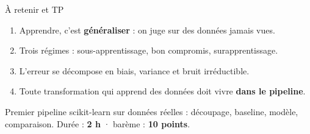 \begin{frame}{À retenir et TP}
\begin{kbox}
\begin{enumerate}
  \item Apprendre, c'est \textbf{généraliser} : on juge sur des données jamais vues.
  \item Trois régimes : sous-apprentissage, bon compromis, surapprentissage.
  \item L'erreur se décompose en biais, variance et bruit irréductible.
  \item Toute transformation qui apprend des données doit vivre \textbf{dans le pipeline}.
\end{enumerate}
\end{kbox}
\vspace{1.5mm}
\begin{abox}
Premier pipeline scikit-learn sur données réelles : découpage, baseline,
modèle, comparaison. Durée : \textbf{2 h} · barème : \textbf{10 points}.
\end{abox}
\end{frame}
